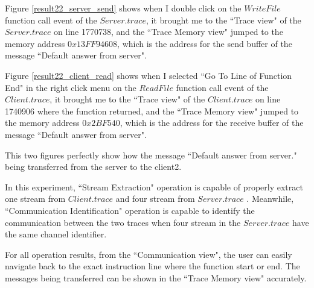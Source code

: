 Figure \ref{result22_server_send} shows when I double click on the $WriteFile$ function call event of the $Server.trace$, it brought me to the ``Trace view" of the $Server.trace$ on line 1770738, and the ``Trace Memory view" jumped to the memory address $0x13FF94608$, which is the address for the send buffer of the message ``Default answer from server".

Figure \ref{result22_client_read} shows when I selected ``Go To Line of Function End" in the right click menu on the $ReadFile$ function call event of the $Client.trace$, it brought me to the ``Trace view" of the $Client.trace$ on line 1740906 where the function returned, and the ``Trace Memory view" jumped to the memory address $0x2BF540$, which is the address for the receive buffer of the message ``Default answer from server".

This two figures perfectly show how the message ``Default answer from server." being transferred from the server to the client2.

In this experiment, ``Stream Extraction" operation is capable of properly extract one stream from $Client.trace$ and four stream from  $Server.trace$ . Meanwhile, ``Communication Identification" operation is capable to identify the communication between the two traces when four stream in the $Server.trace$ have the same channel identifier. 

For all operation results, from the ``Communication view", the user can easily navigate back to the exact instruction line where the function start or end. The messages being transferred can be shown in the ``Trace Memory view" accurately.







   




